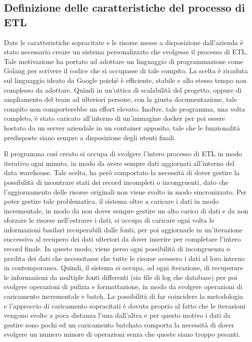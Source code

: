 \subsection{Definizione delle caratteristiche del processo di ETL}

Date le caratteristiche sopracitate e le risorse messe a disposizione dall'azienda è stato necessario creare un sistema personalizzato che svolgesse il processo di ETL. Tale motivazione ha portato ad adottare un linguaggio di programmazione come Golang per scrivere il codice che si occupasse di tale compito. La scelta è ricaduta sul linguaggio ideato da Google poiché è efficiente, stabile e allo stesso tempo non complesso da adottare. Quindi in un'ottica di scalabilità del progetto, oppure di ampliamento del team ad ulteriori persone, con la giusta documentazione, tale compito non comporterebbe un effort elevato. Inoltre, tale programma, una volta completo, è stato caricato all'interno di un'immagine docker per poi essere hostato da un server aziendale in un container apposito, tale che le funzionalità predisposte siano sempre a disposizione degli utenti finali.

Il programma così creato si occupa di svolgere l'intero processo di ETL in modo iterativo ogni minuto, in modo da avere sempre dati aggiornati all'interno del data warehouse. Tale scelta, ha però comportato la necessità di dover gestire la possibilità di incontrare stati dei record incompleti o incongruenti, dato che l'aggiornamento delle risorse originali non viene svolto in modo sincronizzato. Per poter gestire tale problematica, il sistema oltre a caricare i dati in modo incrementale, in modo da non dover sempre gestire un alto carico di dati e da non sforzare le risorse nell'estrarre i dati, si occupa di caricare ogni volta le informazioni basilari recuperabili dalle fonti, per poi aggiornarle in un'iterazione successiva al recupero dei dati ulteriori da dover inserire per completare l'intero record finale. In questo modo, viene perso ogni possibilità di incongruenza o perdita dei dati che necessitasse che tutte le risorse avessero i dati al loro interno in contemporanea. Quindi, il sistema si occupa, ad ogni iterazione, di recuperare le informazioni da multiple fonti differenti (sia file di log che database) per poi svolgere operazioni di pulizia e formattazione, in modo da svolgere operazioni di caricamento incrementale e batch. La possibilità di far coincidere la metodologia e l'approccio di caricamento sopracitati è dovuta proprio al fatto che le iterazioni vengono svolte a poca distanza l'una dall'altra e per questo motivo i dati da gestire sono pochi ed un caricamento batchato comporta la necessità di dover svolgere un numero minore di operazioni senza che queste siano troppo pesanti.

